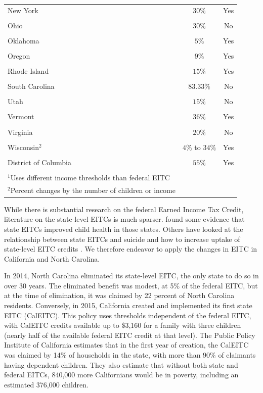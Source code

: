 \documentclass{article}
\begin{document}
\begin{longtable}[h]{lcc}
\\[-1.8ex] 
 New York & $30\%$ & Yes \\
\\[-1.8ex] 
 Ohio & $30\%$ & No \\
\\[-1.8ex] 
 Oklahoma & $5\%$ & Yes \\
\\[-1.8ex] 
 Oregon & $9\%$ & Yes \\
\\[-1.8ex] 
 Rhode Island & $15\%$ & Yes \\
\\[-1.8ex] 
 South Carolina & $83.33\%$ & No \\
\\[-1.8ex] 
 Utah & $15\%$ & No \\
\\[-1.8ex] 
 Vermont & $36\%$ & Yes \\
\\[-1.8ex] 
 Virginia & $20\%$ & No \\
\\[-1.8ex] 
 Wisconsin$^{2}$ & $4\%$ to $34\%$ & Yes \\
\\[-1.8ex] 
 District of Columbia & $55\%$ & Yes \\
 \hline\\[-1.8ex] 
\footnotesize $^{1}$Uses different income thresholds than federal EITC\\
\footnotesize $^{2}$Percent changes by the number of children or income
\label{fig:eitc_states}{}
\end{longtable}



While there is substantial research on the federal Earned Income Tax Credit, literature on the state-level EITCs is much sparser. \cite{baughman2012effects} found some evidence that state EITCs improved child health in those states. Others have looked at the relationship between state EITCs and suicide \citep{lenhart2019effects} and how to increase uptake of state-level EITC credits \citep{linos2020can}. We therefore endeavor to apply the changes in EITC in California and North Carolina. 

In 2014, North Carolina eliminated its state-level EITC, the only state to do so in over 30 years. The eliminated benefit was modest, at 5\% of the federal EITC, but at the time of elimination, it was claimed by 22 percent of North Carolina residents. Conversely, in 2015, California created and implemented its first state EITC (CalEITC). This policy uses thresholds independent of the federal EITC, with CalEITC credits available up to \$3,160 for a family with three children (nearly half of the available federal EITC credit at that level). The Public Policy Institute of California estimates that in the first year of creation, the CalEITC was claimed by 14\% of households in the state, with more than 90\% of claimants having dependent children. They also estimate that without both state and federal EITCs, 840,000 more Californians would be in poverty, including an estimated 376,000 children.  
\end{document}
